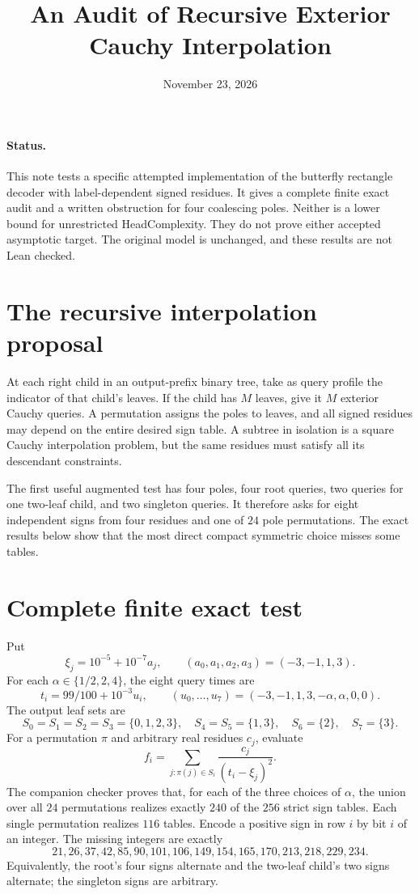 \documentclass[11pt]{article}
\title{An Audit of Recursive Exterior Cauchy Interpolation}
\author{}
\date{November 23, 2026}
\begin{document}
\maketitle

\paragraph{Status.}
This note tests a specific attempted implementation of the butterfly
rectangle decoder with label-dependent signed residues. It gives a
complete finite exact audit and a written obstruction for four
coalescing poles. Neither is a lower bound for unrestricted
HeadComplexity. They do not prove either accepted asymptotic target.
The original model is unchanged, and these results are not Lean checked.

\section{The recursive interpolation proposal}
At each right child in an output-prefix binary tree, take as query
profile the indicator of that child's leaves. If the child has $M$
leaves, give it $M$ exterior Cauchy queries. A permutation assigns
the poles to leaves, and all signed residues may depend on the entire
desired sign table. A subtree in isolation is a square Cauchy
interpolation problem, but the same residues must satisfy all its
descendant constraints.

The first useful augmented test has four poles, four root queries,
two queries for one two-leaf child, and two singleton queries. It
therefore asks for eight independent signs from four residues and
one of $24$ pole permutations. The exact results below show that the
most direct compact symmetric choice misses some tables.

\section{Complete finite exact test}
Put
\[
 \xi_j=10^{-5}+10^{-7}a_j,\qquad
 (a_0,a_1,a_2,a_3)=(-3,-1,1,3).
\]
For each $\alpha\in\{1/2,2,4\}$, the eight query times are
\[
 t_i=99/100+10^{-3}u_i,
 \qquad
 (u_0,\ldots,u_7)=(-3,-1,1,3,-\alpha,\alpha,0,0).
\]
The output leaf sets are
\[
 S_0=S_1=S_2=S_3=\{0,1,2,3\},\quad
 S_4=S_5=\{1,3\},\quad S_6=\{2\},\quad S_7=\{3\}.
\]
For a permutation $\pi$ and arbitrary real residues $c_j$, evaluate
\[
 f_i=\sum_{j:\pi(j)\in S_i}\frac{c_j}{(t_i-\xi_j)^2}.
 \tag{1}\label{eq:test}
\]
The companion checker proves that, for each of the three choices of
$\alpha$, the union over all $24$ permutations realizes exactly
$240$ of the $256$ strict sign tables. Each single permutation
realizes $116$ tables. Encode a positive sign in row $i$ by bit $i$
of an integer. The missing integers are exactly
\[
 21,26,37,42,85,90,101,106,
 149,154,165,170,213,218,229,234.
\]
Equivalently, the root's four signs alternate and the two-leaf
child's two signs alternate; the singleton signs are arbitrary.
\end{document}
